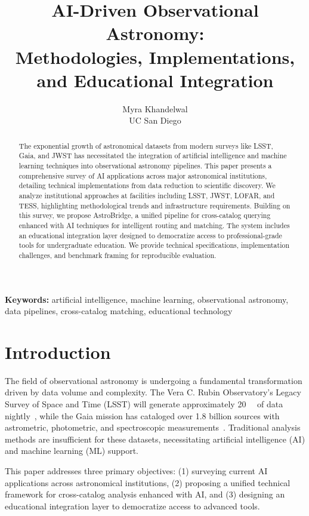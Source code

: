 \documentclass[10pt]{article}
\title{\textbf{AI-Driven Observational Astronomy: \\ Methodologies, Implementations, and Educational Integration}}
\author{
    Myra Khandelwal \\
    UC San Diego \\
}
\date{}
\newcommand{\ai}[1]{\textcolor{astrob}{#1}}
\newcommand{\astron}[1]{\textcolor{astroorange}{#1}}
\newcommand{\dataset}[1]{\textsf{#1}}
\begin{document}
\maketitle

\begin{abstract}
The exponential growth of astronomical datasets from modern surveys like LSST, Gaia, and JWST has necessitated the integration of \ai{artificial intelligence} and machine learning techniques into observational astronomy pipelines. This paper presents a comprehensive survey of \ai{AI} applications across major astronomical institutions, detailing technical implementations from data reduction to scientific discovery. We analyze institutional approaches at facilities including LSST, JWST, LOFAR, and TESS, highlighting methodological trends and infrastructure requirements. Building on this survey, we propose \astron{AstroBridge}, a unified pipeline for cross-catalog querying enhanced with \ai{AI} techniques for intelligent routing and matching. The system includes an educational integration layer designed to democratize access to professional-grade tools for undergraduate education. We provide technical specifications, implementation challenges, and benchmark framing for reproducible evaluation.
\end{abstract}

\begin{center}
\textbf{Keywords:} artificial intelligence, machine learning, observational astronomy, data pipelines, cross-catalog matching, educational technology
\end{center}

\section{Introduction}
\label{sec:introduction}

The field of observational astronomy is undergoing a fundamental transformation driven by data volume and complexity. The \dataset{Vera C. Rubin Observatory's Legacy Survey of Space and Time} (LSST) will generate approximately \SI{20}{\tera\byte} of data nightly~\citep{Ivezic2019}, while the \dataset{Gaia} mission has cataloged over 1.8 billion sources with astrometric, photometric, and spectroscopic measurements~\citep{Gaiacollaboration2021}. Traditional analysis methods are insufficient for these datasets, necessitating \ai{artificial intelligence} (\ai{AI}) and machine learning (\ai{ML}) support.

This paper addresses three primary objectives: (1) surveying current \ai{AI} applications across astronomical institutions, (2) proposing a unified technical framework for cross-catalog analysis enhanced with \ai{AI}, and (3) designing an educational integration layer to democratize access to advanced tools.
\end{document}
